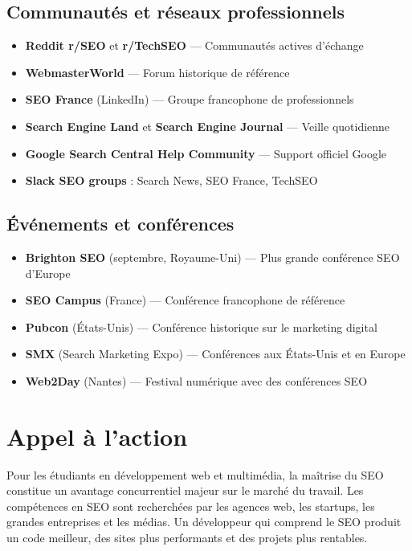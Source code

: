 \documentclass[12pt,a4paper,twoside]{report}
\newcommand{\keyword}[1]{\textbf{\textcolor{googleblue}{#1}}}
\begin{document}
\subsection*{Communautés et réseaux professionnels}
\begin{itemize}
    \item \keyword{Reddit r/SEO} et \keyword{r/TechSEO} — Communautés actives d'échange
    \item \keyword{WebmasterWorld} — Forum historique de référence
    \item \keyword{SEO France} (LinkedIn) — Groupe francophone de professionnels
    \item \keyword{Search Engine Land} et \keyword{Search Engine Journal} — Veille quotidienne
    \item \keyword{Google Search Central Help Community} — Support officiel Google
    \item \keyword{Slack SEO groups} : Search News, SEO France, TechSEO
\end{itemize}

\subsection*{Événements et conférences}
\begin{itemize}
    \item \keyword{Brighton SEO} (septembre, Royaume-Uni) — Plus grande conférence SEO d'Europe
    \item \keyword{SEO Campus} (France) — Conférence francophone de référence
    \item \keyword{Pubcon} (États-Unis) — Conférence historique sur le marketing digital
    \item \keyword{SMX} (Search Marketing Expo) — Conférences aux États-Unis et en Europe
    \item \keyword{Web2Day} (Nantes) — Festival numérique avec des conférences SEO
\end{itemize}

\section*{Appel à l'action}

Pour les étudiants en développement web et multimédia, la maîtrise du SEO constitue un avantage concurrentiel majeur sur le marché du travail. Les compétences en SEO sont recherchées par les agences web, les startups, les grandes entreprises et les médias. Un développeur qui comprend le SEO produit un code meilleur, des sites plus performants et des projets plus rentables.
\end{document}
